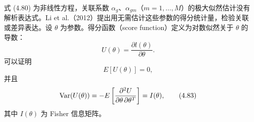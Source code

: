 式 (4.80) 为非线性方程，关联系数 $\alpha_g$、$\alpha_{gm}$（$m=1,\ldots,M$）的极大似然估计没有解析表达式。Li et al.（2012）提出用无需估计这些参数的得分统计量，检验关联或差异表达。设 $\theta$ 为参数。得分函数（score function）定义为对数似然关于 $\theta$ 的导数：
\begin{equation}
U(\theta)=\frac{\partial l(\theta)}{\partial\theta}.
\tag{4.81}
\end{equation}
可以证明
\begin{equation}
E[U(\theta)]=0,
\tag{4.82}
\end{equation}
并且
\begin{equation}
\operatorname{Var}(U(\theta))=-E\left[\frac{\partial^2U}{\partial\theta\,\partial\theta^T}\right]=I(\theta),
\tag{4.83}
\end{equation}
其中 $I(\theta)$ 为 Fisher 信息矩阵。

